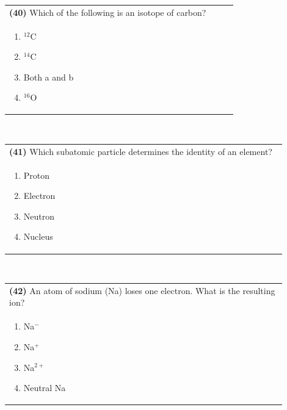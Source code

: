 \documentclass{article}
\begin{document}
\noindent \begin{tabular}{|p{0.9\linewidth}|}
\hline
\vspace{0.2cm}
\textbf{(40)} Which of the following is an isotope of carbon? \\
\begin{minipage}[t]{0.85\linewidth}
\begin{enumerate}[label=\alph*.]
\item $^{12}$C
\item $^{14}$C
\item Both a and b
\item $^{16}$O
\end{enumerate}
\end{minipage}\\
\hline
\end{tabular}
\\
\newpage
\noindent \begin{tabular}{|p{0.9\linewidth}|}
\hline
\vspace{0.2cm}
\textbf{(41)} Which subatomic particle determines the identity of an element? \\
\begin{minipage}[t]{0.85\linewidth}
\begin{enumerate}[label=\alph*.]
\item Proton
\item Electron
\item Neutron
\item Nucleus
\end{enumerate}
\end{minipage}\\
\hline
\end{tabular}
\\

\vspace{0.5cm}
\noindent \begin{tabular}{|p{0.9\linewidth}|}
\hline
\vspace{0.2cm}
\textbf{(42)} An atom of sodium (Na) loses one electron. What is the resulting ion? \\
\begin{minipage}[t]{0.85\linewidth}
\begin{enumerate}[label=\alph*.]
\item Na$^-$
\item Na$^{+}$
\item Na$^{2+}$
\item Neutral Na
\end{enumerate}
\end{minipage}\\
\hline
\end{tabular}
\\
\end{document}
